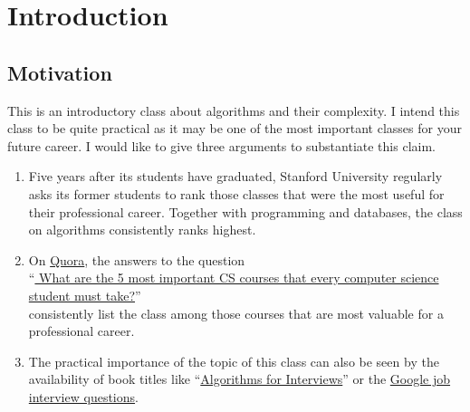 \chapter{Introduction}
\section{Motivation}
This is an introductory class about algorithms and their complexity.
I intend this class to be quite practical as it may be one of the most important classes for your future
career.  I would like to give three arguments to substantiate this claim.
\begin{enumerate}
\item Five years after its students have graduated, Stanford University
      regularly asks its former students to rank those classes that were the most useful for their professional
      career.  Together with programming and databases, the class on algorithms consistently ranks highest.
\item On \href{https://quora.com}{Quora}, the answers to the question
      \\[0.1cm]
      \hspace*{0.0cm}
      ``\href{https://www.quora.com/What-are-the-5-most-important-CS-courses-that-every-computer-science-student-must-take}{
        What are the 5 most important CS courses that every computer science student must take?}''
      \\[0.1cm]
      consistently list the class  among those courses that are most valuable
      for a professional career.  
\item The practical importance of the topic of this class can also be seen by the
      availability of book titles like
      ``\href{https://www.amazon.com/Algorithms-Interviews-Adnan-Aziz/dp/1453792996}{Algorithms for Interviews}''  
      \cite{aziz:10} or the \href{http://www.youtube.com/watch?v=k4RRi_ntQc8}{Google job interview questions}.
\end{enumerate} 
 
